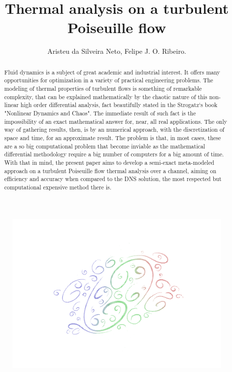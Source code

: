 \documentclass[10pt]{article} %
\title{ \loll Thermal analysis on a turbulent Poiseuille flow}
\author{Aristeu da Silveira Neto,  Felipe J. O. Ribeiro.}
\begin{document}
\maketitle

\begin{figure}[h!]
	\centering
	\includegraphics[angle=0, scale=0.60]{turbulence}
	\label{turbulence}
\end{figure}

\begin{abstract}
	\noindent Fluid dynamics is a subject of great academic and industrial interest. It offers many opportunities for optimization in a variety of practical engineering problems. The modeling of thermal properties of turbulent flows is something of remarkable complexity, that can be explained mathematically by the chaotic nature of this non-linear high order differential analysis, fact beautifully stated in the Strogatz`s book "Nonlinear Dynamics and Chaos". The immediate result of such fact is the impossibility of an exact mathematical answer for, near, all real applications. The only way of gathering results, then, is by an numerical approach, with the discretization of space and time, for an approximate result. The problem is that, in most cases, these are a so big computational problem that become inviable as the mathematical differential methodology require a big number of computers for a big amount of time. With that in mind, the present paper aims to develop a semi-exact meta-modeled approach on a turbulent Poiseuille flow thermal analysis over a channel, aiming on efficiency and accuracy when compared to the DNS solution, the most respected but computational expensive method there is. 
\end{abstract}
\end{document}
